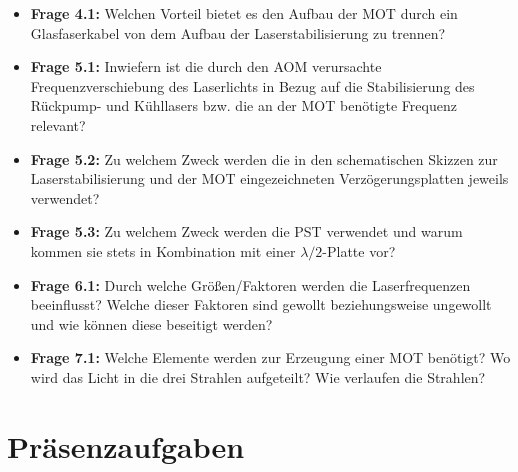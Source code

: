 \documentclass[
class=book,
accentcolor=1b,
custommargins=geometry,
fontsize=11pt,
thesis={type=Versuchsanleitung},
ruledheaders=all,
headline=false,
instbox=false,
marginpar=false,
title=small,
ignore-missing-data=true,
twoside=false,
logofile=apqdesign/tuda_logo.pdf,
pdfa=false %
]{apqpub}
\begin{document}
\begin{itemize}
	\item \textbf{Frage 4.1:} Welchen Vorteil bietet es den Aufbau der MOT durch ein Glasfaserkabel von dem Aufbau der Laserstabilisierung zu trennen?
	
	\item \textbf{Frage 5.1:} Inwiefern ist die durch den AOM verursachte Frequenzverschiebung des Laserlichts in Bezug auf die Stabilisierung des Rückpump- und Kühllasers bzw. die an der MOT benötigte Frequenz relevant?
	
	\item \textbf{Frage 5.2:} Zu welchem Zweck werden die in den schematischen Skizzen zur Laserstabilisierung und der MOT eingezeichneten Verzögerungsplatten jeweils verwendet?
	
	\item \textbf{Frage 5.3:} Zu welchem Zweck werden die PST verwendet und warum kommen sie stets in Kombination mit einer $\lambda/2$-Platte vor?  
	
	\item \textbf{Frage 6.1:} Durch welche Größen/Faktoren werden die Laserfrequenzen beeinflusst? Welche dieser Faktoren sind gewollt beziehungsweise ungewollt und wie können diese beseitigt werden?
	
	\item \textbf{Frage 7.1:} Welche Elemente werden zur Erzeugung einer MOT benötigt? Wo wird das Licht in die drei Strahlen aufgeteilt? Wie verlaufen die Strahlen?
\end{itemize}
\newpage
\section{Präsenzaufgaben}
\end{document}
